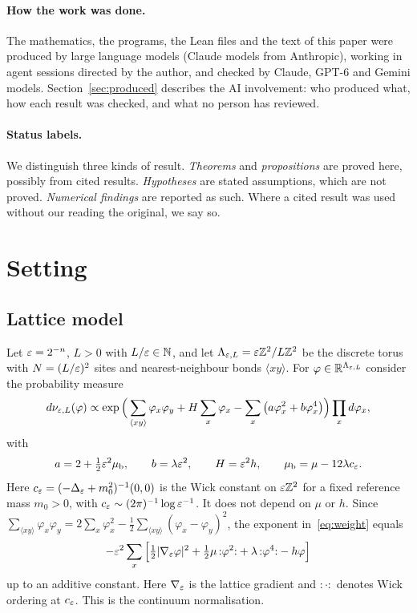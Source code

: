 \paragraph{How the work was done.} The mathematics, the programs, the Lean files and the text of this paper were produced by large language models (Claude models from Anthropic), working in agent sessions directed by the author, and checked by Claude, GPT-6 and Gemini models. Section~\ref{sec:produced} describes the AI involvement: who produced what, how each result was checked, and what no person has reviewed.

\paragraph{Status labels.} We distinguish three kinds of result. \emph{Theorems} and \emph{propositions} are proved here, possibly from cited results. \emph{Hypotheses} are stated assumptions, which are not proved. \emph{Numerical findings} are reported as such. Where a cited result was used without our reading the original, we say so.

\section{Setting}\label{sec:setting}

\subsection{Lattice model}
Let $\varepsilon=2^{-n}$, $L>0$ with $L/\varepsilon\in\mathbb N$, and let $\Lambda_{\varepsilon,L}=\varepsilon\mathbb Z^2/L\mathbb Z^2$ be the discrete torus with $N=(L/\varepsilon)^2$ sites and nearest-neighbour bonds $\langle xy\rangle$. For $\varphi\in\mathbb R^{\Lambda_{\varepsilon,L}}$ consider the probability measure
\begin{equation}\label{eq:weight}
d\nu_{\varepsilon,L}(\varphi)\propto \exp\Big(\sum_{\langle xy\rangle}\varphi_x\varphi_y+H\sum_x\varphi_x-\sum_x\big(a\varphi_x^2+b\varphi_x^4\big)\Big)\prod_x d\varphi_x ,
\end{equation}
with
\begin{equation}\label{eq:params}
a=2+\tfrac12\varepsilon^2\mu_{\mathrm b},\qquad b=\lambda\varepsilon^2,\qquad H=\varepsilon^2h,\qquad \mu_{\mathrm b}=\mu-12\lambda c_\varepsilon .
\end{equation}
Here $c_\varepsilon=(-\Delta_\varepsilon+m_0^2)^{-1}(0,0)$ is the Wick constant on $\varepsilon\mathbb Z^2$ for a fixed reference mass $m_0>0$, with $c_\varepsilon\sim(2\pi)^{-1}\log\varepsilon^{-1}$. It does not depend on $\mu$ or $h$. Since $\sum_{\langle xy\rangle}\varphi_x\varphi_y=2\sum_x\varphi_x^2-\tfrac12\sum_{\langle xy\rangle}(\varphi_x-\varphi_y)^2$, the exponent in~\eqref{eq:weight} equals
\[
-\varepsilon^2\sum_x\Big[\tfrac12|\nabla_\varepsilon\varphi|^2+\tfrac12\mu\,{:}\varphi^2{:}+\lambda\,{:}\varphi^4{:}-h\varphi\Big]
\]
up to an additive constant. Here $\nabla_\varepsilon$ is the lattice gradient and ${:}\cdot{:}$ denotes Wick ordering at $c_\varepsilon$. This is the continuum normalisation.

